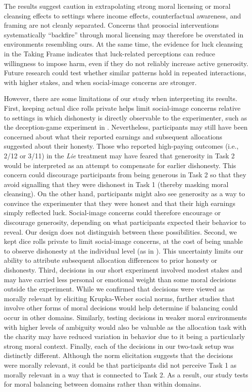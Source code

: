 \documentclass{article}
\begin{document}
\par
The results suggest caution in extrapolating strong moral licensing or moral cleansing effects to settings where income effects, counterfactual awareness, and framing are not cleanly separated. Concerns that prosocial interventions systematically ``backfire'' through moral licensing may therefore be overstated in environments resembling ours. At the same time, the evidence for luck cleansing in the Taking Frame indicates that luck-related perceptions can reduce willingness to impose harm, even if they do not reliably increase active generosity. Future research could test whether similar patterns hold in repeated interactions, with higher stakes, and when social-image concerns are stronger.
\par
However, there are some limitations of our study when interpreting its results. First, keeping actual dice rolls private helps limit social-image concerns relative to settings in which dishonesty is directly observable to the experimenter, such as the deception-game experiment in \textcite{Gneezy2014}. Nevertheless, participants may still have been concerned about what their reported earnings and subsequent allocations suggested about their honesty. Those who reported high-paying outcomes (i.e., 2/12 or 3/11) in the \textit{Lie} treatment may have feared that generosity in Task 2 would be interpreted as an attempt to compensate for earlier dishonesty. This concern could discourage participants from being generous in Task 2 so that they avoid signalling that they were dishonest in Task 1 (thereby masking moral cleansing). On the other hand, participants might also see generosity as a way to convince the experimenter that they were honest and that their high earnings simply reflected luck. Social-image concerns could therefore encourage or discourage generosity, depending on what participants expected their behavior to reveal. Our design does not distinguish between these possibilities. Second, we kept dice rolls private to limit social-image concerns, at the cost of being unable to observe dishonesty at the individual level (as in \cite{Ploner2013}). This uncertainty limits our ability to attribute subsequent allocation differences to prior honesty or dishonesty. Third, decisions in our short experiment involved modest stakes and may have carried less personal or emotional weight than some moral decisions outside the experiment. While we confirmed that decisions were viewed as morally relevant by eliciting Krupka-Weber social norms, further studies that involve other forms of moral decisions would help determine if balancing could occur in other domains. Similarly, testing decisions in weaker moral environments with higher levels of ambiguity would also be valuable as the allocation task with the charity may have reduced variation in behavior due to it being a particularly strong moral context. Finally, each of the decisions in our two-task setup was distinctly different. Although the norm elicitation suggests that the decisions were morally relevant, it could be that participants did not perceive Task 1 as morally relevant in a way that is connected to Task 2. As a result, our study tests for moral balancing between domains rather than within domains. 
\end{document}
